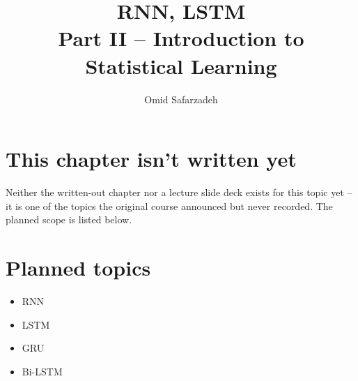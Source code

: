 \documentclass[11pt]{article}
\title{RNN, LSTM \\ \large Part II -- Introduction to Statistical Learning}
\author{Omid Safarzadeh}
\date{}
\begin{document}
\maketitle

\section*{This chapter isn't written yet}
Neither the written-out chapter nor a lecture slide deck exists for this
topic yet -- it is one of the topics the original course announced but
never recorded. The planned scope is listed below.



\section*{Planned topics}
\begin{itemize}
  \item RNN
  \item LSTM
  \item GRU
  \item Bi-LSTM
\end{itemize}
\end{document}
